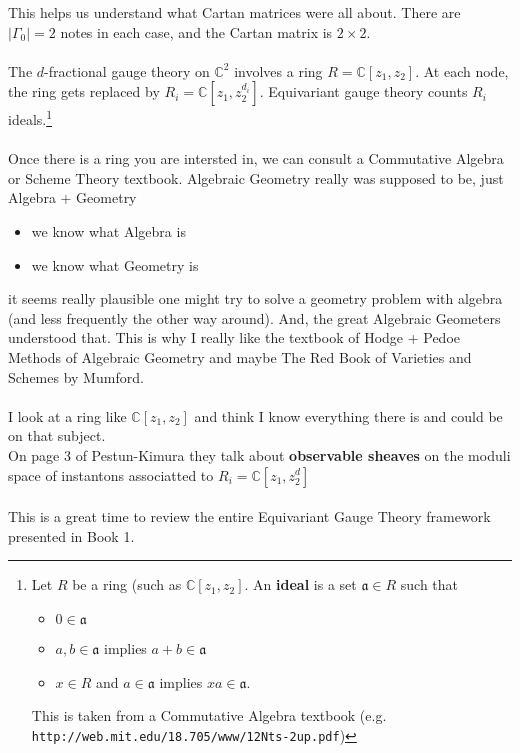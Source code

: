\documentclass[12pt]{article}
\begin{document}
This helps us understand what Cartan matrices were all about.  There are $|\Gamma_0| = 2$ notes in each case, and the Cartan matrix is $2 \times 2$.  \\ \\
The $d$-fractional gauge theory on $\mathbb{C}^2$ involves a ring $R = \mathbb{C}[z_1, z_2] $.  At each node, the ring gets replaced by $R_ i= \mathbb{C}[z_1, z_2^{d_i}]$.  Equivariant gauge theory counts $R_i$ ideals.\footnote{Let $R$ be a ring (such as $\mathbb{C}[z_1, z_2]$.  An \textbf{ideal} is a set $\mathfrak{a} \in R$ such that
\begin{itemize}
\item $0 \in \mathfrak{a}$
\item $a,b \in \mathfrak{a}$ implies $a+b \in \mathfrak{a}$
\item $x \in R$ and $a \in \mathfrak{a}$ implies $xa \in \mathfrak{a}$.
\end{itemize} 
This is taken from a Commutative Algebra textbook (e.g. \texttt{http://web.mit.edu/18.705/www/12Nts-2up.pdf})} \\ \\
Once there is a ring you are intersted in, we can consult a Commutative Algebra or Scheme Theory textbook.  Algebraic Geometry really was supposed to be, just Algebra + Geometry
\begin{itemize}
\item we know what Algebra is
\item we know what Geometry is
\end{itemize}
it seems really plausible one might try to solve a geometry problem with algebra (and less frequently the other way around).  And, the great Algebraic Geometers understood that. This is why I really like the textbook of Hodge + Pedoe {\color{red!50!orange}Methods of Algebraic Geometry} and maybe {\color{black!50!white}The Red Book of Varieties and Schemes} by Mumford. \\ \\
I look at a ring like $\mathbb{C}[z_1, z_2]$ and think I know everything there is and could be on that subject. \\ On page 3 of Pestun-Kimura they talk about \textbf{observable sheaves} on the moduli space of instantons associatted to $R_i = \mathbb{C}[z_1, z_2^d]$ \\ \\
This is a great time to review the entire Equivariant Gauge Theory framework presented in Book 1.

\newpage
\end{document}
